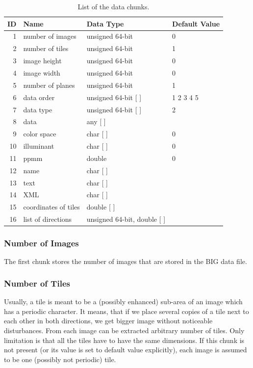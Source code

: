 \documentclass{article}
\begin{document}
\begin{table}
\caption{\label{tab:chunks}List of the data chunks.}
\begin{center}
\begin{tabular}{rlll}
ID & Name & Data Type & Default Value \\
\hline
 1 & number of images & unsigned 64-bit & 0\\
 2 & number of tiles & unsigned 64-bit & 1\\
 3 & image height & unsigned 64-bit & 0\\
 4 & image width & unsigned 64-bit & 0\\
 5 & number of planes & unsigned 64-bit & 1\\

 6 & data order & unsigned 64-bit [ ] & 1 2 3 4 5\\

 7 & data type & unsigned 64-bit [ ] & 2\\

 8 & data & any [ ] & \\

 9 & color space & char [ ] & 0 \\
10 & illuminant & char [ ] & 0 \\

11 & ppmm & double & 0 \\

12 & name & char [ ] & \\
13 & text & char [ ] & \\
14 & XML & char [ ] & \\
15 & coordinates of tiles & double [ ] & \\
16 & list of directions & unsigned 64-bit, double [ ] & \\
\end{tabular}
\end{center}
\end{table}

\subsubsection{Number of Images}
The first chunk stores the number of images that are stored in the BIG data file.

\subsubsection{Number of Tiles}
Usually, a tile is meant to be a (possibly enhanced) sub-area of an image which has a periodic character. It means, that if we place several copies of a tile next to each other in both directions, we get bigger image without noticeable disturbances. From each image can be extracted arbitrary number of tiles. Only limitation is that all the tiles have to have the same dimensions. If this chunk is not present (or its value is set to default value explicitly), each image is assumed to be one (possibly not periodic) tile.
\end{document}
